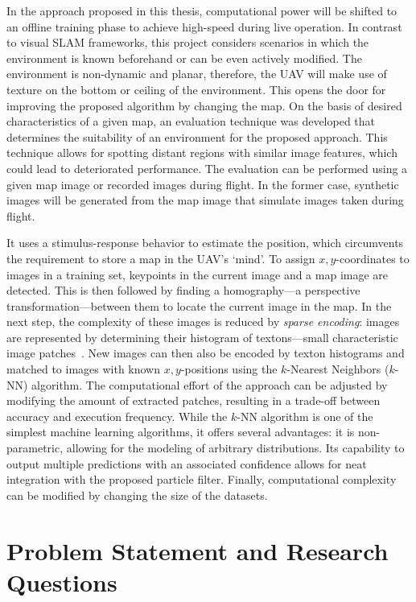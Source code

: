 \documentclass{report}
\begin{document}
In the approach proposed in this thesis, computational power will be
shifted to an offline training phase to achieve high-speed during live
operation. In contrast to visual SLAM frameworks, this project
considers scenarios in which the environment is known beforehand or
can be even actively modified. The environment is non-dynamic and
planar, therefore, the UAV will make use of texture on the bottom or
ceiling of the environment. This opens the door for improving the
proposed algorithm by changing the map. On the basis of desired
characteristics of a given map, an evaluation technique was developed
that determines the suitability of an environment for the proposed
approach. This technique allows for spotting distant regions with
similar image features, which could lead to deteriorated
performance. The evaluation can be performed using a given map image
or recorded images during flight. In the former case, synthetic images
will be generated from the map image that simulate images taken during
flight.

It uses a stimulus-response behavior to estimate the position, which
circumvents the requirement to store a map in the UAV's `mind'. To
assign $x,y$-coordinates to images in a training set, keypoints in the
current image and a map image are detected. This is then followed by
finding a homography---a perspective transformation---between them to
locate the current image in the map. In the next step, the complexity
of these images is reduced by \emph{sparse encoding}: images are
represented by determining their histogram of textons---small
characteristic image patches~\cite{varma2005statistical}.  New images
can then also be encoded by texton histograms and matched to images
with known $x,y$-positions using the $k$-Nearest Neighbors ($k$-NN)
algorithm. The computational effort of the approach can be adjusted by
modifying the amount of extracted patches, resulting in a trade-off
between accuracy and execution frequency. While the $k$-NN algorithm
is one of the simplest machine learning algorithms, it offers several
advantages: it is non-parametric, allowing for the modeling of
arbitrary distributions. Its capability to output multiple predictions
with an associated confidence allows for neat integration with the
proposed particle filter. Finally, computational complexity can be
modified by changing the size of the datasets.

\section{Problem Statement and Research Questions}
\label{sec:researchquestions}
\end{document}
